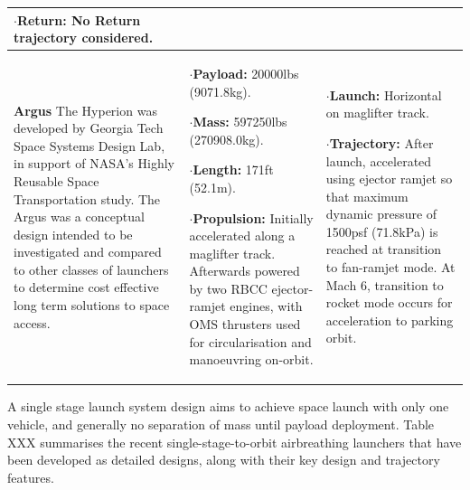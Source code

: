 {\begin{landscape}
\begin{xltabular}{\linewidth}{|X|X|X|}
$\cdot$\textbf{Return:} No Return trajectory considered.

\\
\hline \small\textbf{Argus}\cite{Argus} \newline\newline
The Hyperion was developed by Georgia Tech Space Systems Design Lab, in support of NASA's Highly Reusable Space Transportation study. The Argus was a conceptual design intended to be investigated and compared to other classes of launchers to determine cost effective long term solutions to space access.  
&\small
{}

$\cdot$\textbf{Payload:} 20000lbs (9071.8kg).

$\cdot$\textbf{Mass:} 597250lbs (270908.0kg).

$\cdot$\textbf{Length:} 171ft (52.1m). 

$\cdot$\textbf{Propulsion:} Initially accelerated along a maglifter track. Afterwards powered by two RBCC ejector-ramjet engines, with OMS thrusters used for circularisation and manoeuvring on-orbit. 

&\small
$\cdot$\textbf{Launch:} Horizontal on maglifter track. 

$\cdot$\textbf{Trajectory:} After launch, accelerated using ejector ramjet so that maximum dynamic pressure of 1500psf (71.8kPa) is reached at transition to fan-ramjet mode. 
At Mach 6, transition to rocket mode occurs for acceleration to parking orbit.\\ 

\hline 
\end{xltabular} 
	\end{landscape}
}

A single stage launch system design aims to achieve space launch with only one vehicle, and generally no separation of mass until payload deployment. Table XXX summarises the recent single-stage-to-orbit airbreathing launchers that have been developed as detailed designs, along with their key design and trajectory features. 


